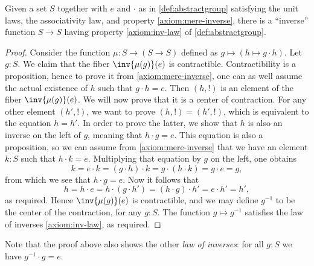 \begin{lemma}%
  \label{lem:group-inv-operation}%
  Given a set $S$ together with $e$ and $\cdot$ as in
  \cref{def:abstractgroup} satisfying the unit laws, the associativity
  law, and property \ref{axiom:mere-inverse}, there is a ``inverse'' function
  $S \to S$ having property \ref{axiom:inv-law} of \cref{def:abstractgroup}.
\end{lemma}

\begin{proof}
  Consider the function $\mu: S \to (S \to S)$ defined as
  $g\mapsto (h \mapsto g\cdot h)$. Let $g:S$. We claim that the fiber
  $\inv{\mu(g)}(e)$ is contractible.  Contractibility is a proposition, hence to
  prove it from \ref{axiom:mere-inverse}, one can as well assume the
  actual existence of $h$ such that $g\cdot h = e$. Then $(h,!)$ is an
  element of the fiber $\inv{\mu(g)}(e)$. We will now prove that it is
  a center of contraction. For any other element $(h',!)$, we want to
  prove $(h,!) = (h',!)$, which is equivalent to the equation $h=h'$. In
  order to prove the latter, we show that $h$ is also an inverse on
  the left of $g$, meaning that $h\cdot g=e$.  This equation is also a
  proposition, so we can assume from \ref{axiom:mere-inverse} that we have an
  element $k:S$ such that $h\cdot k = e$.  Multiplying that equation by
  $g$ on the left, one obtains
  \begin{displaymath}
    k = e \cdot k = (g\cdot h)\cdot k = g\cdot (h\cdot k) = g\cdot e = g,
  \end{displaymath}
  from which we see that $h\cdot g=e$.
  Now it follows that
  \begin{displaymath}
    h = h \cdot e = h \cdot (g\cdot h') = (h \cdot g) \cdot h' = e \cdot h' = h',
  \end{displaymath}
  as required. Hence $\inv{\mu(g)}(e)$ is contractible, and we may define $g^{-1}$ to
  be the center of the contraction, for any $g:S$.
  The function $g \mapsto g^{-1}$ satisfies the law of inverses \ref{axiom:inv-law}, as required.
\end{proof}
Note that the proof above also shows the other \emph{law of inverses}:
for all $g:S$ we have $g^{-1}\cdot g=e$.

